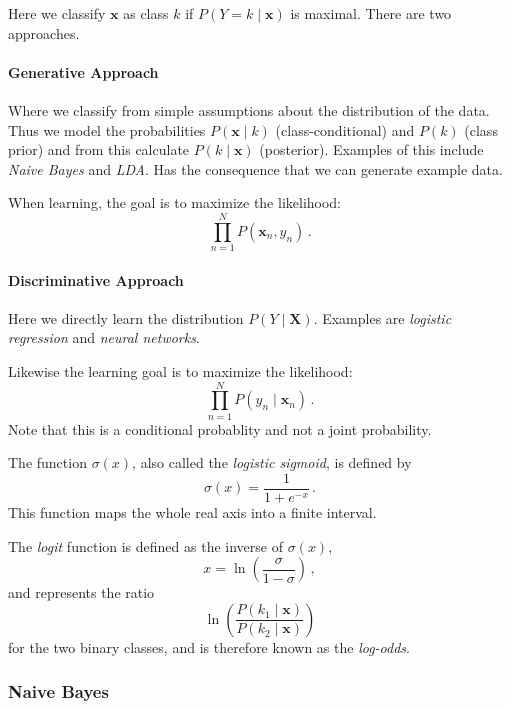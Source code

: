 Here we classify $\mathbf{x}$ as class $k$ if $P(Y = k \mid \mathbf{x})$ is maximal.
There are two approaches.

\paragraph{Generative Approach} Where we classify from simple assumptions about the distribution of the data.
    Thus we model the probabilities $P(\mathbf{x} \mid k)$ (class-conditional) and $P(k)$ (class prior) and from this calculate $P(k \mid \mathbf{x})$ (posterior).
    Examples of this include \emph{Naive Bayes} and \emph{LDA}.
    Has the consequence that we can generate example data.

    When learning, the goal is to maximize the likelihood:
    \[
        \prod_{n=1}^N P(\mathbf{x}_n, y_n)\,.
    \]

\paragraph{Discriminative Approach} Here we directly learn the distribution $P(Y \mid \mathbf{X})$.
    Examples are \emph{logistic regression} and \emph{neural networks}.

    Likewise the learning goal is to maximize the likelihood:
    \[
        \prod_{n=1}^N P(y_n \mid \mathbf{x}_n)\,.
    \]
    Note that this is a conditional probablity and not a joint probability.

\begin{mdframed}[frametitle={Sigmoid, Logit, and log-odds}]
    The function $\sigma(x)$, also called the \emph{logistic sigmoid}, is defined by
    \[
        \sigma(x) = \frac 1 {1 + e^{-x}}\,.
    \]
    This function maps the whole real axis into a finite interval.

    The \emph{logit} function is defined as the inverse of $\sigma(x)$,
    \[
        x = \ln \left( \frac \sigma {1 - \sigma} \right)\,,
    \]
    and represents the ratio
    \[
        \ln \left( \frac {P(k_1 \mid \mathbf{x})} {P(k_2 \mid \mathbf{x})} \right)
    \]
    for the two binary classes, and is therefore known as the \emph{log-odds}.
\end{mdframed}

\subsubsection{Naive Bayes}

\begin{figure}[H]
    \centering
\end{figure}

